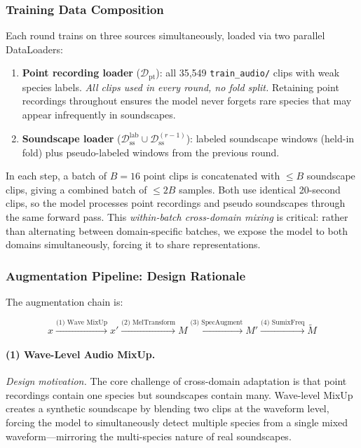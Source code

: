 \documentclass[journal]{IEEEtran}
\begin{document}
\subsubsection{Training Data Composition}

Each round trains on three sources simultaneously, loaded via two parallel DataLoaders:

\begin{enumerate}
  \item \textbf{Point recording loader} ($\mathcal{D}_\text{pt}$): all 35,549 \texttt{train\_audio/} clips with weak species labels. \emph{All clips used in every round, no fold split.} Retaining point recordings throughout ensures the model never forgets rare species that may appear infrequently in soundscapes.
  \item \textbf{Soundscape loader} ($\mathcal{D}_\text{ss}^\text{lab} \cup \mathcal{D}_\text{ss}^{(r-1)}$): labeled soundscape windows (held-in fold) plus pseudo-labeled windows from the previous round.
\end{enumerate}

In each step, a batch of $B=16$ point clips is concatenated with $\leq B$ soundscape clips, giving a combined batch of $\leq 2B$ samples.
Both use identical 20-second clips, so the model processes point recordings and pseudo soundscapes through the same forward pass.
This \emph{within-batch cross-domain mixing} is critical: rather than alternating between domain-specific batches, we expose the model to both domains simultaneously, forcing it to share representations.

\subsubsection{Augmentation Pipeline: Design Rationale}

The augmentation chain is:
\begin{strip}
\[
x \xrightarrow{\text{(1) Wave MixUp}} x' \xrightarrow{\text{(2) MelTransform}} M \xrightarrow{\text{(3) SpecAugment}} M' \xrightarrow{\text{(4) SumixFreq}} \tilde{M}
\]
\end{strip}

\paragraph{(1) Wave-Level Audio MixUp.}
\emph{Design motivation.}
The core challenge of cross-domain adaptation is that point recordings contain one species but soundscapes contain many.
Wave-level MixUp creates a synthetic soundscape by blending two clips at the waveform level, forcing the model to simultaneously detect multiple species from a single mixed waveform---mirroring the multi-species nature of real soundscapes.
\end{document}
